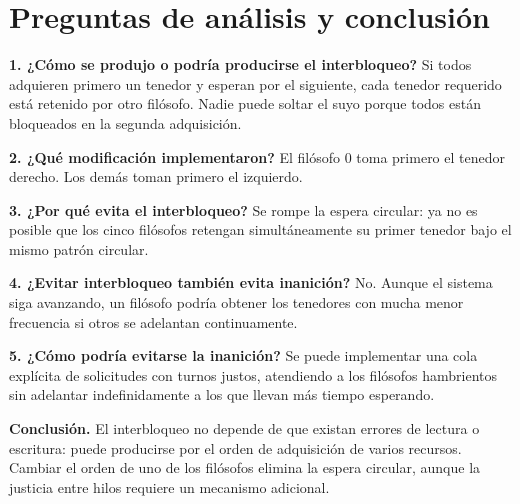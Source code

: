 \documentclass[12pt,oneside]{book}
\begin{document}
\chapter{Preguntas de análisis y conclusión}
\textbf{1. ¿Cómo se produjo o podría producirse el interbloqueo?} Si todos adquieren primero un tenedor y esperan por el siguiente, cada tenedor requerido está retenido por otro filósofo. Nadie puede soltar el suyo porque todos están bloqueados en la segunda adquisición.

\textbf{2. ¿Qué modificación implementaron?} El filósofo 0 toma primero el tenedor derecho. Los demás toman primero el izquierdo.

\textbf{3. ¿Por qué evita el interbloqueo?} Se rompe la espera circular: ya no es posible que los cinco filósofos retengan simultáneamente su primer tenedor bajo el mismo patrón circular.

\textbf{4. ¿Evitar interbloqueo también evita inanición?} No. Aunque el sistema siga avanzando, un filósofo podría obtener los tenedores con mucha menor frecuencia si otros se adelantan continuamente.

\textbf{5. ¿Cómo podría evitarse la inanición?} Se puede implementar una cola explícita de solicitudes con turnos justos, atendiendo a los filósofos hambrientos sin adelantar indefinidamente a los que llevan más tiempo esperando.

\textbf{Conclusión.} El interbloqueo no depende de que existan errores de lectura o escritura: puede producirse por el orden de adquisición de varios recursos. Cambiar el orden de uno de los filósofos elimina la espera circular, aunque la justicia entre hilos requiere un mecanismo adicional.
\end{document}
